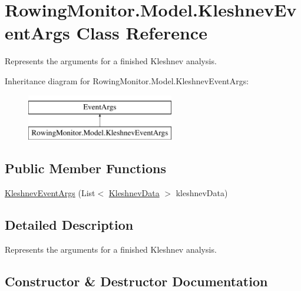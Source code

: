 \hypertarget{class_rowing_monitor_1_1_model_1_1_kleshnev_event_args}{}\section{Rowing\+Monitor.\+Model.\+Kleshnev\+Event\+Args Class Reference}
\label{class_rowing_monitor_1_1_model_1_1_kleshnev_event_args}


Represents the arguments for a finished Kleshnev analysis.  


Inheritance diagram for Rowing\+Monitor.\+Model.\+Kleshnev\+Event\+Args\+:\begin{figure}[H]
\begin{center}
\leavevmode
\includegraphics[height=2.000000cm]{class_rowing_monitor_1_1_model_1_1_kleshnev_event_args}
\end{center}
\end{figure}
\subsection*{Public Member Functions}
\begin{DoxyCompactItemize}
\item 
\hyperlink{class_rowing_monitor_1_1_model_1_1_kleshnev_event_args_ad371c1b70b890d6991665a29120fb554}{Kleshnev\+Event\+Args} (List$<$ \hyperlink{struct_rowing_monitor_1_1_model_1_1_pipeline_1_1_kleshnev_data}{Kleshnev\+Data} $>$ kleshnev\+Data)
\end{DoxyCompactItemize}


\subsection{Detailed Description}
Represents the arguments for a finished Kleshnev analysis. 



\subsection{Constructor \& Destructor Documentation}
\mbox{\label{class_rowing_monitor_1_1_model_1_1_kleshnev_event_args_ad371c1b70b890d6991665a29120fb554}} 
